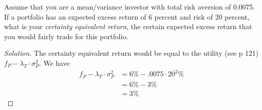 \begin{problem}{4.5}
 Assume that you are a mean/variance investor with total risk aversion of 0.0075. If a portfolio has an expected excess return of 6 percent and risk of 20 percent, what is your \textit{certainty equivalent return}, the certain expected excess return that you would fairly trade for this portfolio.
\end{problem}

\begin{proof}[Solution]
 The certainty equivalent return would be equal to the utility (see p 121) $f_{P}-\lambda_{T}\cdot\sigma_{P}^{2}$. We have
 \begin{align*}
  f_{P}-\lambda_{T}\cdot\sigma_{P}^{2}&=6\%-.0075\cdot 20^{2}\% \\
				      &=6\%-3\%\\
				      &=3\%
 \end{align*}

\end{proof}

